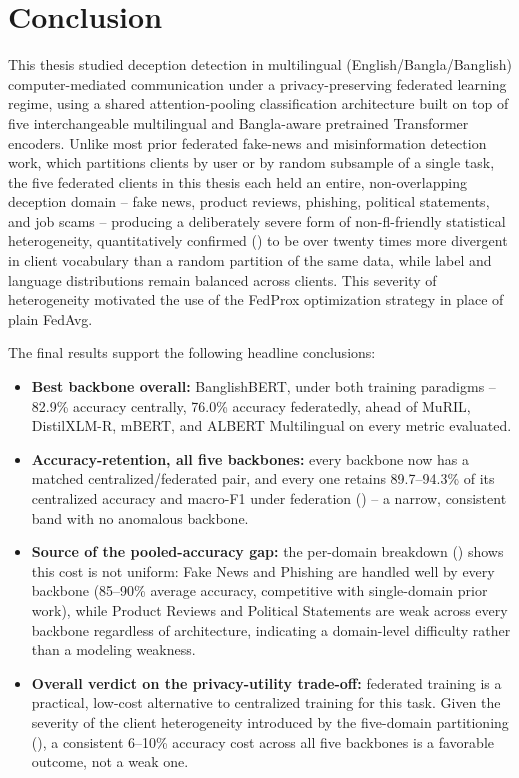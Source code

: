 \section{Conclusion}

This thesis studied deception detection in multilingual (English/Bangla/Banglish) computer-mediated communication under a privacy-preserving federated learning regime, using a shared attention-pooling classification architecture built on top of five interchangeable multilingual and Bangla-aware pretrained Transformer encoders. Unlike most prior federated fake-news and misinformation detection work, which partitions clients by user or by random subsample of a single task, the five federated clients in this thesis each held an entire, non-overlapping deception domain -- fake news, product reviews, phishing, political statements, and job scams -- producing a deliberately severe form of non-\gls{fl}-friendly statistical heterogeneity, quantitatively confirmed () to be over twenty times more divergent in client vocabulary than a random partition of the same data, while label and language distributions remain balanced across clients. This severity of heterogeneity motivated the use of the FedProx optimization strategy in place of plain FedAvg.

The final results support the following headline conclusions:
\begin{itemize}
    \item \textbf{Best backbone overall:} BanglishBERT, under both training paradigms -- 82.9\% accuracy centrally, 76.0\% accuracy federatedly, ahead of MuRIL, DistilXLM-R, mBERT, and ALBERT Multilingual on every metric evaluated.
    \item \textbf{Accuracy-retention, all five backbones:} every backbone now has a matched centralized/federated pair, and every one retains 89.7--94.3\% of its centralized accuracy and macro-F1 under federation () -- a narrow, consistent band with no anomalous backbone.
    \item \textbf{Source of the pooled-accuracy gap:} the per-domain breakdown () shows this cost is not uniform: Fake News and Phishing are handled well by every backbone (85--90\% average accuracy, competitive with single-domain prior work), while Product Reviews and Political Statements are weak across every backbone regardless of architecture, indicating a domain-level difficulty rather than a modeling weakness.
    \item \textbf{Overall verdict on the privacy-utility trade-off:} federated training is a practical, low-cost alternative to centralized training for this task. Given the severity of the client heterogeneity introduced by the five-domain partitioning (), a consistent 6--10\% accuracy cost across all five backbones is a favorable outcome, not a weak one.
\end{itemize}

